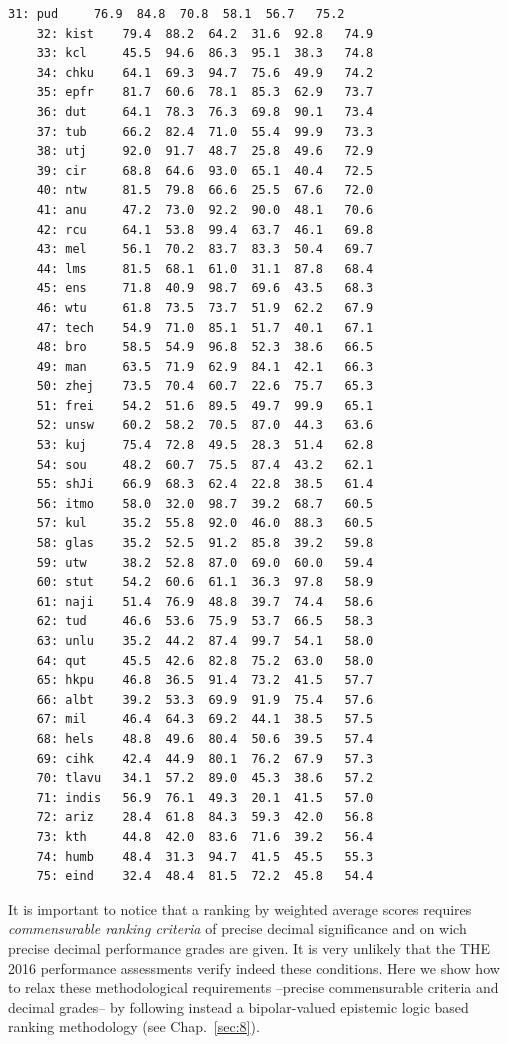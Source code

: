 \begin{lstlisting}[caption={Printing the ranked performance table},label=list:13.5,basicstyle=\ttfamily\scriptsize]
    31: pud 	76.9  84.8  70.8  58.1  56.7   75.2
    32: kist 	79.4  88.2  64.2  31.6  92.8   74.9
    33: kcl 	45.5  94.6  86.3  95.1  38.3   74.8
    34: chku 	64.1  69.3  94.7  75.6  49.9   74.2
    35: epfr 	81.7  60.6  78.1  85.3  62.9   73.7
    36: dut 	64.1  78.3  76.3  69.8  90.1   73.4
    37: tub 	66.2  82.4  71.0  55.4  99.9   73.3
    38: utj 	92.0  91.7  48.7  25.8  49.6   72.9
    39: cir 	68.8  64.6  93.0  65.1  40.4   72.5
    40: ntw 	81.5  79.8  66.6  25.5  67.6   72.0
    41: anu 	47.2  73.0  92.2  90.0  48.1   70.6
    42: rcu 	64.1  53.8  99.4  63.7  46.1   69.8
    43: mel 	56.1  70.2  83.7  83.3  50.4   69.7
    44: lms 	81.5  68.1  61.0  31.1  87.8   68.4
    45: ens 	71.8  40.9  98.7  69.6  43.5   68.3
    46: wtu 	61.8  73.5  73.7  51.9  62.2   67.9
    47: tech 	54.9  71.0  85.1  51.7  40.1   67.1
    48: bro 	58.5  54.9  96.8  52.3  38.6   66.5
    49: man 	63.5  71.9  62.9  84.1  42.1   66.3
    50: zhej 	73.5  70.4  60.7  22.6  75.7   65.3
    51: frei 	54.2  51.6  89.5  49.7  99.9   65.1
    52: unsw 	60.2  58.2  70.5  87.0  44.3   63.6
    53: kuj 	75.4  72.8  49.5  28.3  51.4   62.8
    54: sou 	48.2  60.7  75.5  87.4  43.2   62.1
    55: shJi 	66.9  68.3  62.4  22.8  38.5   61.4
    56: itmo 	58.0  32.0  98.7  39.2  68.7   60.5
    57: kul 	35.2  55.8  92.0  46.0  88.3   60.5
    58: glas 	35.2  52.5  91.2  85.8  39.2   59.8
    59: utw 	38.2  52.8  87.0  69.0  60.0   59.4
    60: stut 	54.2  60.6  61.1  36.3  97.8   58.9
    61: naji 	51.4  76.9  48.8  39.7  74.4   58.6
    62: tud 	46.6  53.6  75.9  53.7  66.5   58.3
    63: unlu 	35.2  44.2  87.4  99.7  54.1   58.0
    64: qut 	45.5  42.6  82.8  75.2  63.0   58.0
    65: hkpu 	46.8  36.5  91.4  73.2  41.5   57.7
    66: albt 	39.2  53.3  69.9  91.9  75.4   57.6
    67: mil 	46.4  64.3  69.2  44.1  38.5   57.5
    68: hels 	48.8  49.6  80.4  50.6  39.5   57.4
    69: cihk 	42.4  44.9  80.1  76.2  67.9   57.3
    70: tlavu 	34.1  57.2  89.0  45.3  38.6   57.2
    71: indis 	56.9  76.1  49.3  20.1  41.5   57.0
    72: ariz 	28.4  61.8  84.3  59.3  42.0   56.8
    73: kth 	44.8  42.0  83.6  71.6  39.2   56.4
    74: humb 	48.4  31.3  94.7  41.5  45.5   55.3
    75: eind 	32.4  48.4  81.5  72.2  45.8   54.4
\end{lstlisting}

It is important to notice that a ranking by weighted average scores requires \emph{commensurable ranking criteria} of precise decimal significance and on wich precise decimal performance grades are given. It is very unlikely that the THE 2016 performance assessments verify indeed these conditions. Here we show how to relax these methodological requirements --precise commensurable criteria and decimal grades-- by following instead a bipolar-valued epistemic logic based ranking methodology (see Chap.~\ref{sec:8}).

